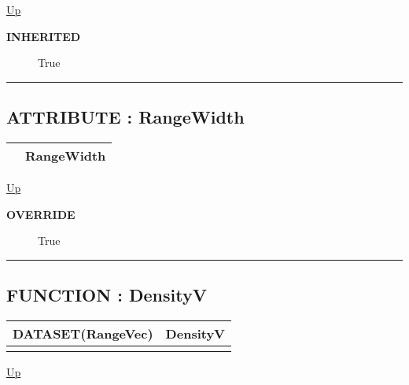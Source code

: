 \hyperlink{ecldoc:linearregression.ols.normaldistribution}{Up}

\par

\par
\begin{description}
\item [\textbf{INHERITED}] True
\end{description}

\rule{\textwidth}{0.4pt}
\subsection*{ATTRIBUTE : RangeWidth}
\hypertarget{ecldoc:linearregression.ols.distributionbase.rangewidth}{}

{\renewcommand{\arraystretch}{1.5}
\begin{tabularx}{\textwidth}{|>{\raggedright\arraybackslash}l|X|}
\hline
\hspace{0pt} & RangeWidth \\
\hline
\end{tabularx}
}

\hyperlink{ecldoc:linearregression.ols.normaldistribution}{Up}

\par

\par
\begin{description}
\item [\textbf{OVERRIDE}] True
\end{description}

\rule{\textwidth}{0.4pt}
\subsection*{FUNCTION : DensityV}
\hypertarget{ecldoc:linearregression.ols.distributionbase.densityv}{}

{\renewcommand{\arraystretch}{1.5}
\begin{tabularx}{\textwidth}{|>{\raggedright\arraybackslash}l|X|}
\hline
\hspace{0pt}DATASET(RangeVec) & DensityV \\
\hline
\multicolumn{2}{|>{\raggedright\arraybackslash}X|}{\hspace{0pt}()} \\
\hline
\end{tabularx}
}

\hyperlink{ecldoc:linearregression.ols.normaldistribution}{Up}

\par

